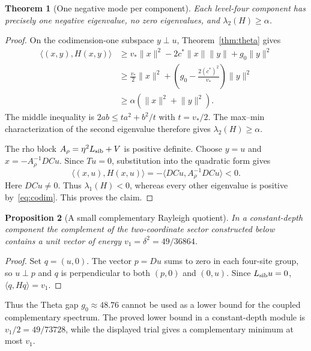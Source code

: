 \documentclass[journal,a4paper,10pt]{IEEEtran}
\newtheorem{theorem}{Theorem}
\newtheorem{proposition}[theorem]{Proposition}
\theoremstyle{definition}\newtheorem{definition}[theorem]{Definition}
\theoremstyle{remark}\newtheorem{remark}[theorem]{Remark}
\newcommand{\ip}[2]{\langle #1,#2\rangle}
\newcommand{\norm}[1]{\lVert #1\rVert}
\begin{document}
\begin{theorem}[One negative mode per component]\label{thm:negative}
Each level-four component has precisely one negative eigenvalue, no zero eigenvalues, and $\lambda_2(H)\geq\alpha$.
\end{theorem}
\begin{proof}
On the codimension-one subspace $y\perp u$, Theorem~\ref{thm:theta} gives
\begin{align}
\ip{(x,y)}{H(x,y)}
&\geq v_*\norm{x}^2-2c^*\norm{x}\norm{y}+g_0\norm{y}^2\nonumber\\
&\geq\frac{v_*}{2}\norm{x}^2+
\left(g_0-\frac{2(c^*)^2}{v_*}\right)\norm{y}^2\nonumber\\
&\geq\alpha(\norm{x}^2+\norm{y}^2).\label{eq:codim}
\end{align}
The middle inequality is $2ab\leq t a^2+b^2/t$ with $t=v_*/2$. The max--min characterization of the second eigenvalue therefore gives $\lambda_2(H)\geq\alpha$.

The rho block $A_\rho=\eta^2L_{\rm sib}+V$ is positive definite. Choose $y=u$ and $x=-A_\rho^{-1}DCu$. Since $Tu=0$, substitution into the quadratic form gives
\begin{equation}
\ip{(x,u)}{H(x,u)}=-\ip{DCu}{A_\rho^{-1}DCu}<0.
\end{equation}
Here $DCu\ne0$. Thus $\lambda_1(H)<0$, whereas every other eigenvalue is positive by~\eqref{eq:codim}. This proves the claim.
\end{proof}

\begin{proposition}[A small complementary Rayleigh quotient]\label{prop:smallgap}
In a constant-depth component the complement of the two-coordinate sector constructed below contains a unit vector of energy $v_1=\delta^2=49/36864$.
\end{proposition}
\begin{proof}
Set $q=(u,0)$. The vector $p=Du$ sums to zero in each four-site group, so $u\perp p$ and $q$ is perpendicular to both $(p,0)$ and $(0,u)$. Since $L_{\rm sib}u=0$, $\ip q{Hq}=v_1$.
\end{proof}
Thus the Theta gap $g_0\approx48.76$ cannot be used as a lower bound for the coupled complementary spectrum. The proved lower bound in a constant-depth module is $v_1/2=49/73728$, while the displayed trial gives a complementary minimum at most $v_1$.
\end{document}
